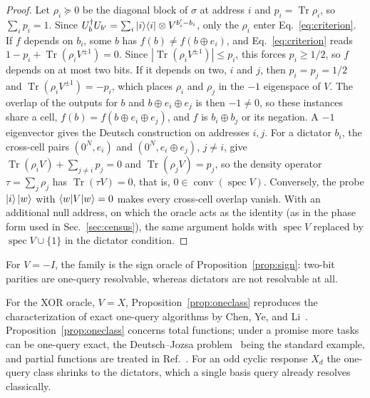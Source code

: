 \documentclass[
  aps,
  pra,
  reprint,
  nofootinbib
]{revtex4-2}
\begin{document}
\begin{proof}
Let \(\rho_i\succeq0\) be the diagonal block of \(\sigma\) at address \(i\) and
\(p_i=\operatorname{Tr}\rho_i\), so \(\sum_ip_i=1\). Since
\(U_b^\dagger U_{b'}=\sum_i\ket i\!\bra i\otimes V^{b'_i-b_i}\), only the
\(\rho_i\) enter Eq.~\eqref{eq:criterion}. If \(f\) depends on \(b_i\), some
\(b\) has \(f(b)\neq f(b\oplus e_i)\), and Eq.~\eqref{eq:criterion} reads
\(1-p_i+\operatorname{Tr}(\rho_iV^{\pm1})=0\). Since
\(|\operatorname{Tr}(\rho_iV^{\pm1})|\le p_i\), this forces \(p_i\ge1/2\), so
\(f\) depends on at most two bits. If it depends on two, \(i\) and \(j\), then
\(p_i=p_j=1/2\) and \(\operatorname{Tr}(\rho_iV^{\pm1})=-p_i\), which places
\(\rho_i\) and \(\rho_j\) in the \(-1\) eigenspace of \(V\). The overlap of the
outputs for \(b\) and \(b\oplus e_i\oplus e_j\) is then \(-1\neq0\), so these
instances share a cell, \(f(b)=f(b\oplus e_i\oplus e_j)\), and \(f\) is
\(b_i\oplus b_j\) or its negation. A \(-1\) eigenvector gives the Deutsch
construction on addresses \(i,j\). For a dictator \(b_i\), the cross-cell
pairs \((0^N,e_i)\) and \((0^N,e_i\oplus e_j)\), \(j\neq i\), give
\(\operatorname{Tr}(\rho_iV)+\sum_{j\neq i}p_j=0\) and
\(\operatorname{Tr}(\rho_jV)=p_j\), so the density operator
\(\tau=\sum_j\rho_j\) has \(\operatorname{Tr}(\tau V)=0\), that is,
\(0\in\operatorname{conv}(\operatorname{spec}V)\). Conversely, the probe
\(\ket i\ket w\) with \(\braket{w|V|w}=0\) makes every cross-cell overlap
vanish. With an additional null address, on which the oracle acts as the
identity (as in the phase form used in Sec.~\ref{sec:census}), the same
argument holds with \(\operatorname{spec}V\) replaced by
\(\operatorname{spec}V\cup\{1\}\) in the dictator condition.
\end{proof}

For \(V=-I\), the family is the sign oracle of Proposition~\ref{prop:sign}:
two-bit parities are one-query resolvable, whereas dictators are not
resolvable at all.

For the XOR oracle, \(V=X\), Proposition~\ref{prop:oneclass} reproduces the
characterization of exact one-query algorithms by Chen, Ye, and
Li~\cite{ChenYeLi2020}. Proposition~\ref{prop:oneclass} concerns total
functions; under a promise more tasks can be one-query exact, the
Deutsch--Jozsa problem~\cite{deutsch:92} being the standard example, and
partial functions are treated in Ref.~\cite{YeLi2020partial}. For an odd cyclic response \(X_d\) the one-query
class shrinks to the dictators, which a single basis query already resolves
classically.
\end{document}
